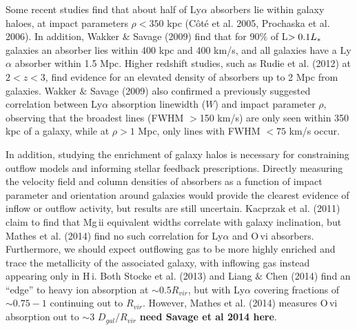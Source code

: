 \documentclass[iop]{emulateapj-rtx4}
\begin{document}


Some recent studies find that about half of Ly$\alpha$ absorbers lie within galaxy haloes, at impact parameters $\rho<350$ kpc (C\^{o}t\'{e} et al. 2005, Prochaska et al. 2006). In addition, Wakker $\&$ Savage (2009) find that for 90$\%$ of L$>0.1L_{\**}$ galaxies an absorber lies within 400 kpc and 400 km/s, and all galaxies have a Ly$\alpha$ absorber within 1.5 Mpc. Higher redshift studies, such as Rudie et al. (2012) at $2<z<3$, find evidence for an elevated density of absorbers up to 2 Mpc from galaxies. Wakker $\&$ Savage (2009) also confirmed a previously suggested correlation between Ly$\alpha$ absorption linewidth ($W$) and impact parameter $\rho$, observing that the broadest lines (FWHM $>$150 km/s) are only seen within 350 kpc of a galaxy, while at $\rho>1$ Mpc, only lines with FWHM $<75$ km/s occur.


In addition, studying the enrichment of galaxy halos is necessary for constraining outflow models and informing stellar feedback prescriptions. Directly measuring the velocity field and column densities of absorbers as a function of impact parameter and orientation around galaxies would provide the clearest evidence of inflow or outflow activity, but results are still uncertain. Kacprzak et al. (2011) claim to find that Mg\,{\sc ii} equivalent widths correlate with galaxy inclination, but Mathes et al. (2014) find no such correlation for Ly$\alpha$ and O\,{\sc vi} absorbers. Furthermore, we should expect outflowing gas to be more highly enriched and trace the metallicity of the associated galaxy, with inflowing gas instead appearing only in H\,{\sc i}. Both Stocke et al. (2013) and Liang $\&$ Chen (2014) find an ``edge'' to heavy ion absorption at $\sim0.5R_{vir}$, but with Ly$\alpha$ covering fractions of $\sim0.75-1$ continuing out to $R_{vir}$. However, Mathes et al. (2014) measures O\,{\sc vi} absorption out to $\sim3$ $D_{gal}/R_{vir}$ \textbf{need Savage et al 2014 here}. 
\end{document}

